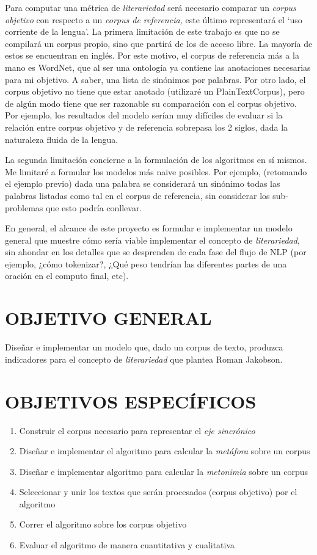 \documentclass[twoside]{article}
\begin{document}
Para computar una métrica de \emph{literariedad} será necesario comparar
un \emph{corpus objetivo} con respecto a un \emph{corpus de referencia,} este
último representará el ‘uso corriente de la lengua'. La primera
limitación de este trabajo es que no se compilará un corpus propio, sino
que partirá de los de acceso libre. La mayoría de estos se encuentran en
inglés. Por este motivo, el corpus de referencia más a la mano es
WordNet, que al ser una ontología ya contiene las anotaciones necesarias
para mi objetivo. A saber, una lista de sinónimos por palabras. Por otro
lado, el corpus objetivo no tiene que estar anotado (utilizaré un
PlainTextCorpus), pero de algún modo tiene que ser razonable su
comparación con el corpus objetivo. Por ejemplo, los resultados del
modelo serían muy difíciles de evaluar si la relación entre corpus
objetivo y de referencia sobrepasa los 2 siglos, dada la naturaleza
fluida de la lengua.

La segunda limitación concierne a la formulación de los algoritmos en sí
mismos. Me limitaré a formular los modelos más naive posibles. Por
ejemplo, (retomando el ejemplo previo) dada una palabra se considerará
un sinónimo todas las palabras listadas como tal en el corpus de
referencia, sin considerar los sub-problemas que esto podría conllevar.

En general, el alcance de este proyecto es formular e implementar un
modelo general que muestre cómo sería viable implementar el concepto de
\emph{literariedad}, sin ahondar en los detalles que se desprenden de cada
fase del flujo de NLP (por ejemplo, ¿cómo tokenizar?, ¿Qué peso tendrían
las diferentes partes de una oración en el computo final, etc).

\section{OBJETIVO GENERAL}
\label{sec:org51ee356}
Diseñar e implementar un modelo que, dado un corpus de texto, produzca
indicadores para el concepto de \emph{literariedad} que plantea Roman Jakobson.

\section{OBJETIVOS ESPECÍFICOS}
\label{sec:orgb45bbf7}

\begin{enumerate}
\item Construir el corpus necesario para representar el \emph{eje sincrónico}
\item Diseñar e implementar el algoritmo para calcular la \emph{metáfora} sobre un corpus
\item Diseñar e implementar algoritmo para calcular la \emph{metonimia} sobre un corpus
\item Seleccionar y unir los textos que serán procesados (corpus objetivo) por el algoritmo
\item Correr el algoritmo sobre los corpus objetivo
\item Evaluar el algoritmo de manera cuantitativa y cualitativa
\end{enumerate}
\end{document}
